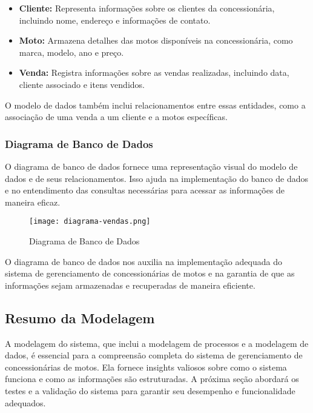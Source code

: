 \begin{itemize}
	\item \textbf{Cliente:} Representa informações sobre os clientes da concessionária, incluindo nome, endereço e informações de contato.
	\item \textbf{Moto:} Armazena detalhes das motos disponíveis na concessionária, como marca, modelo, ano e preço.
	\item \textbf{Venda:} Registra informações sobre as vendas realizadas, incluindo data, cliente associado e itens vendidos.
\end{itemize}

O modelo de dados também inclui relacionamentos entre essas entidades, como a associação de uma venda a um cliente e a motos específicas.

\subsubsection{Diagrama de Banco de Dados}

O diagrama de banco de dados fornece uma representação visual do modelo de dados e de seus relacionamentos. Isso ajuda na implementação do banco de dados e no entendimento das consultas necessárias para acessar as informações de maneira eficaz.

\begin{figure}[h]
	\centering
	\texttt{[image: diagrama-vendas.png]}
	\caption{Diagrama de Banco de Dados}
	\label{fig:Diagrama de Banco de Dados}
\end{figure}

O diagrama de banco de dados nos auxilia na implementação adequada do sistema de gerenciamento de concessionárias de motos e na garantia de que as informações sejam armazenadas e recuperadas de maneira eficiente.

\subsection{Resumo da Modelagem}

A modelagem do sistema, que inclui a modelagem de processos e a modelagem de dados, é essencial para a compreensão completa do sistema de gerenciamento de concessionárias de motos. Ela fornece insights valiosos sobre como o sistema funciona e como as informações são estruturadas. A próxima seção abordará os testes e a validação do sistema para garantir seu desempenho e funcionalidade adequados.


